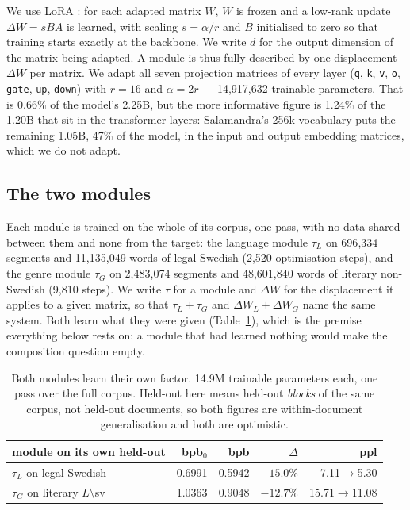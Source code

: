 \documentclass[10pt,twocolumn,a4paper]{article}
\newcommand{\tec}[1]{{\small\texttt{#1}}}
\begin{document}
We use LoRA \cite{hu2022}: for each adapted matrix $W$, $W$ is frozen and a
low-rank update $\Delta W = sBA$ is learned, with scaling $s=\alpha/r$ and $B$
initialised to zero so that training starts exactly at the backbone. We write
$d$ for the output dimension of the matrix being adapted. A module is thus fully
described by one displacement $\Delta W$ per matrix. We adapt all seven
projection matrices of every layer (\tec{q}, \tec{k}, \tec{v}, \tec{o},
\tec{gate}, \tec{up}, \tec{down}) with $r=16$ and $\alpha=2r$ --- 14{,}917{,}632
trainable parameters. That is 0.66\% of the model's 2.25B, but the more
informative figure is 1.24\% of the 1.20B that sit in the transformer layers:
Salamandra's 256k vocabulary puts the remaining 1.05B, 47\% of the model, in the
input and output embedding matrices, which we do not adapt.

\subsection{The two modules}
\label{sec:modules}

Each module is trained on the whole of its corpus, one pass, with no data shared
between them and none from the target: the language module $\tau_L$ on 696{,}334
segments and 11{,}135{,}049 words of legal Swedish (2{,}520 optimisation steps),
and the genre module $\tau_G$ on 2{,}483{,}074 segments and 48{,}601{,}840 words
of literary non-Swedish (9{,}810 steps). We write $\tau$ for a module and
$\Delta W$ for the displacement it applies to a given matrix, so that
$\tau_L+\tau_G$ and $\Delta W_L+\Delta W_G$ name the same system. Both learn what they were given
(Table~\ref{tab:modulos}), which is the premise everything below rests on: a
module that had learned nothing would make the composition question empty.

\begin{table}[htbp]\centering\footnotesize
\setlength{\tabcolsep}{3pt}
\begin{tabular}{@{}@{}lrrrr@{}}
\toprule
module on its own held-out & bpb$_0$ & bpb & $\Delta$ & ppl \\
\midrule
$\tau_L$ on legal Swedish & 0.6991 & 0.5942 & $-15.0$\% & 7.11$\to$5.30 \\
$\tau_G$ on literary $L\!\setminus\!$sv & 1.0363 & 0.9048 & $-12.7$\% & 15.71$\to$11.08 \\
\bottomrule
\end{tabular}
\caption{Both modules learn their own factor. 14.9M trainable parameters each,
one pass over the full corpus. Held-out here means held-out \emph{blocks} of the
same corpus, not held-out documents, so both figures are within-document
generalisation and both are optimistic.}
\label{tab:modulos}
\end{table}
\end{document}
